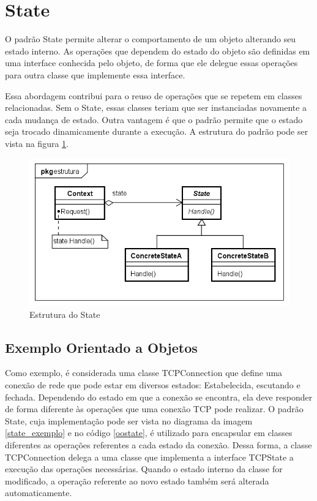 \section{State}

O padrão State permite alterar o comportamento de um objeto 
alterando seu estado interno. As operações que dependem do 
estado do objeto são definidas em uma interface conhecida 
pelo objeto, de forma que ele delegue essas operações 
para outra classe que implemente essa interface. 

Essa abordagem contribui para o reuso de operações 
que se repetem em classes relacionadas. Sem o State, 
essas classes teriam que ser instanciadas novamente 
a cada mudança de estado. Outra vantagem é que o 
padrão permite que o estado seja trocado dinamicamente 
durante a execução. A estrutura do padrão pode ser 
vista na figura \ref{state_struct}.

\begin{figure}[htb]
	\caption{\label{state_struct}Estrutura do State}
	\begin{center}
	    \includegraphics[scale=0.5]{5_padroes-contexto-funcional/5.3_comportamentais/5.3.08_state/state_estrutura.png}
	\end{center}
\end{figure}

\subsection*{Exemplo Orientado a Objetos}

Como exemplo, é considerada uma classe TCPConnection 
que define uma conexão de rede que pode estar em diversos 
estados: Estabelecida, escutando e fechada. Dependendo 
do estado em que a conexão se encontra, ela deve 
responder de forma diferente às operações que uma 
conexão TCP pode realizar. O padrão State, cuja 
implementação pode ser vista no diagrama da imagem 
\ref{state_exemplo} e no código \ref{oostate}, é 
utilizado para encapsular em classes diferentes as 
operações referentes a cada estado da conexão. 
Dessa forma, a classe TCPConnection delega a uma classe 
que implementa a interface TCPState a execução das 
operações necessárias. Quando o estado interno da classe 
for modificado, a operação referente ao novo estado 
também será alterada automaticamente.

